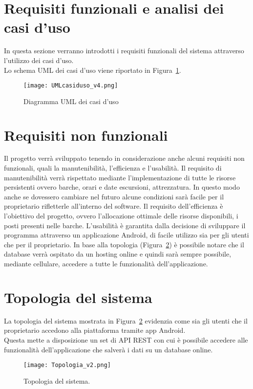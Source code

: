 \section{Requisiti funzionali e analisi dei casi d'uso}

In questa sezione verranno introdotti i requisiti funzionali del sistema attraverso l'utilizzo dei casi d'uso.
\\Lo schema UML dei casi d'uso viene riportato in Figura~\ref{fig:casiduso}.

\begin{figure}[h]
    \centering
    \texttt{[image: UMLcasiduso\_v4.png]}
    \caption{Diagramma UML dei casi d'uso}\label{fig:casiduso}
\end{figure}

\section{Requisiti non funzionali}
Il progetto verrà sviluppato tenendo in considerazione anche alcuni requisiti non funzionali, quali la manutenibilità, l'efficienza e l'usabilità.
Il requisito di manutenibilità verrà rispettato mediante l'implementazione di tutte le risorse persistenti ovvero barche, orari e date escursioni, attrezzatura. In questo modo anche se dovessero cambiare nel futuro alcune condizioni sarà facile per il proprietario rifletterle all'interno del software.
Il requisito dell'efficienza è l'obiettivo del progetto, ovvero l'allocazione ottimale delle risorse disponibili, i posti presenti nelle barche.
L'usabilità è garantita dalla decisione di sviluppare il programma attraverso un applicazione Android, di facile utilizzo sia per gli utenti che per il proprietario. In base alla topologia (Figura~\ref{fig:topologia}) è possibile notare che il database verrà ospitato da un hosting online e quindi sarà sempre possibile, mediante cellulare, accedere a tutte le funzionalità dell'applicazione.

\newpage

\section{Topologia del sistema}
La topologia  del sistema mostrata in Figura~\ref{fig:topologia} evidenzia come sia gli utenti che il proprietario accedono alla piattaforma tramite app Android.
\\Questa mette a disposizione un set di API REST con cui è possibile accedere alle funzionalità dell'applicazione che salverà i dati su un database online.

\begin{figure}[h]
    \centering
    \texttt{[image: Topologia\_v2.png]}
    \caption{Topologia del sistema.}\label{fig:topologia}
\end{figure}